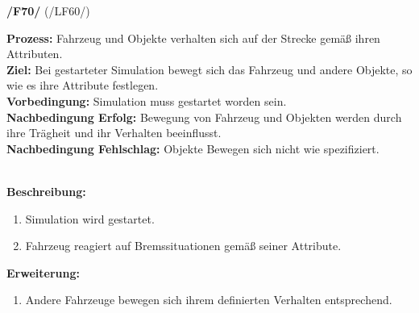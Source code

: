 \documentclass[11pt,a4paper]{article}
\begin{document}
	\noindent\large\textbf{/F70/} (/LF60/)
	\normalsize\\
	\begin{addmargin}{0.1 \textwidth}
		\textbf{Prozess:} Fahrzeug und Objekte verhalten sich auf der Strecke gemäß ihren Attributen.\\
		\textbf{Ziel:} Bei gestarteter Simulation bewegt sich das Fahrzeug und andere Objekte, so wie es ihre Attribute festlegen.\\
		\textbf{Vorbedingung:} Simulation muss gestartet worden sein.\\
		\textbf{Nachbedingung Erfolg:} Bewegung von Fahrzeug und Objekten werden durch ihre Trägheit und ihr Verhalten beeinflusst.\\
		\textbf{Nachbedingung Fehlschlag:} Objekte Bewegen sich nicht wie spezifiziert.\\
		\\
		\begin{minipage}{\textwidth}
			\textbf{Beschreibung:}
			\begin{enumerate}
				\item Simulation wird gestartet.
				\item Fahrzeug reagiert auf Bremssituationen gemäß seiner Attribute.\\
			\end{enumerate}
		\end{minipage}
		\begin{minipage}{\textwidth}
			\textbf{Erweiterung:}
			\begin{enumerate}
				\item Andere Fahrzeuge bewegen sich ihrem definierten Verhalten entsprechend.\\
			\end{enumerate}
		\end{minipage}
	\end{addmargin}
\end{document}
